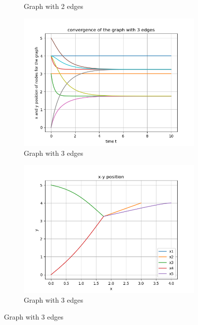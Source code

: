 \documentclass{article}
\begin{document}
\begin{problem}
\begin{figure}[!ht]
\begin{subfigure}{0.4\textwidth}
            \caption{Graph with 2 edges}
        \end{subfigure}
        \begin{subfigure}{0.4\textwidth}
            \includegraphics[width=\textwidth]{./img/p3_edge_3_1.png}
            \caption{Graph with 3 edges}
        \end{subfigure}
        \begin{subfigure}{0.4\textwidth}
            \includegraphics[width=\textwidth]{./img/p3_edge_3_2.png}
            \caption{Graph with 3 edges}
        \end{subfigure}
    \end{figure}


\end{problem}
\end{document}
